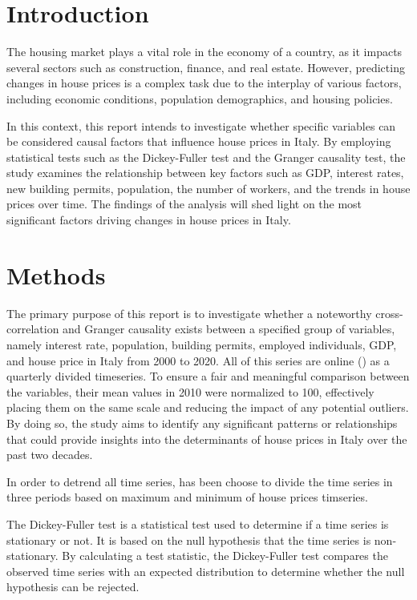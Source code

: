 \documentclass[a4paper,11pt,rmp,superscriptaddress]{report}
\begin{document}
\section*{Introduction}
The housing market plays a vital role in the economy of a country, as it impacts several sectors such as construction, 
finance, and real estate. However, predicting changes in house prices is a complex task due to the interplay of various factors, 
including economic conditions, population demographics, and housing policies. 

In this context, this report intends to investigate whether specific variables can be considered causal factors that influence house 
prices in Italy. By employing statistical tests such as the Dickey-Fuller test and the Granger causality test, the study examines 
the relationship between key factors such as GDP, interest rates, new building permits, population, the number of workers, 
and the trends in house prices over time. The findings of the analysis will shed light on the most significant factors driving changes 
in house prices in Italy.

\section*{Methods}
The primary purpose of this report is to investigate whether a noteworthy cross-correlation and Granger 
causality exists between a specified group of variables, namely interest rate, population, building permits, 
employed individuals, GDP, and house price in Italy from 2000 to 2020. All of this series are online () 
as a quarterly divided timeseries. To ensure a fair and meaningful comparison between the variables, 
their mean values in 2010 were normalized to 100, effectively placing them on the same scale and reducing the impact of any potential 
outliers. By doing so, the study aims to identify any significant patterns or relationships that could provide insights into the 
determinants of house prices in Italy over the past two decades.

In order to detrend all time series, has been choose to divide the time series in three periods based on maximum and minimum 
of house prices timseries.

The Dickey-Fuller test is a statistical test used to determine if a time series is stationary or not. 
It is based on the null hypothesis that the time series  is non-stationary. By calculating a test statistic, the Dickey-Fuller test 
compares the observed time series with an expected distribution to determine whether the null hypothesis can be rejected. 
\end{document}
